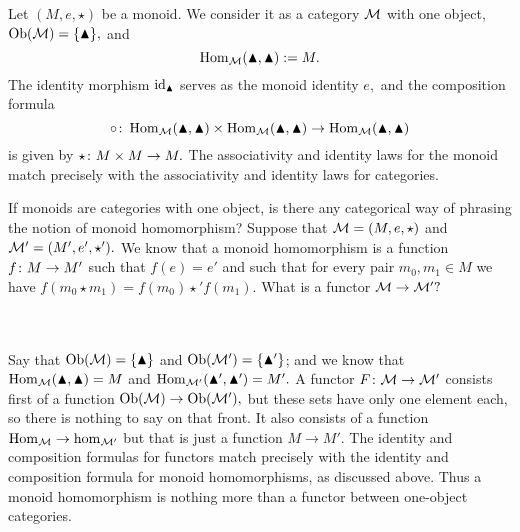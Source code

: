 \documentclass[../main/CT4S-EN-RU]{subfiles}
\begin{document}
\begin{blockENG}
Let $(M,e,\star)$ be a monoid. We consider it as a category $\mathcal{M}$ with one object, $\operatorname{Ob}(\mathcal{M})=\{\blacktriangle\},$ and $$\operatorname{Hom}_\mathcal{M}(\blacktriangle,\blacktriangle):=M.$$ The identity morphism $\operatorname{id}_\blacktriangle$ serves as the monoid identity $e,$ and the composition formula $$\circ\colon\operatorname{Hom}_\mathcal{M}(\blacktriangle,\blacktriangle)\times\operatorname{Hom}_\mathcal{M}(\blacktriangle,\blacktriangle)\rightarrow\operatorname{Hom}_\mathcal{M}(\blacktriangle,\blacktriangle)$$ is given by $\star\colon M\times M\rightarrow M.$ The associativity and identity laws for the monoid match precisely with the associativity and identity laws for categories.
\end{blockENG}

\begin{blockRUS}
\end{blockRUS}

\begin{blockENG}
If monoids are categories with one object, is there any categorical way of phrasing the notion of monoid homomorphism? Suppose that $\mathcal{M}=(M,e,\star)$ and $\mathcal{M}'=(M',e',\star').$ We know that a monoid homomorphism is a function $f\colon M\rightarrow M'$ such that $f(e)=e'$ and such that for every pair $m_0,m_1\in M$ we have $f(m_0\star m_1)=f(m_0)\star' f(m_1).$ What is a functor $\mathcal{M}\rightarrow\mathcal{M}'?$ 
\end{blockENG}

\begin{blockRUS}
\end{blockRUS}

\paragraph{} ~\\

\begin{blockENG}
Say that $\operatorname{Ob}(\mathcal{M})=\{\blacktriangle\}$ and $\operatorname{Ob}(\mathcal{M}')=\{\blacktriangle'\}$; and we know that $\operatorname{Hom}_\mathcal{M}(\blacktriangle,\blacktriangle)=M$ and $\operatorname{Hom}_{\mathcal{M}'}(\blacktriangle',\blacktriangle')=M'.$ A functor $F\colon\mathcal{M}\rightarrow\mathcal{M}'$ consists first of a function $\operatorname{Ob}(\mathcal{M})\rightarrow\operatorname{Ob}(\mathcal{M}'),$ but these sets have only one element each, so there is nothing to say on that front. It also consists of a function $\operatorname{Hom}_\mathcal{M}\rightarrow\hom_{\mathcal{M}'}$ but that is just a function $M\to M'.$ The identity and composition formulas for functors match precisely with the identity and composition formula for monoid homomorphisms, as discussed above. Thus a monoid homomorphism is nothing more than a functor between one-object categories. 
\end{blockENG}
\end{document}
